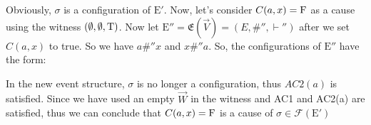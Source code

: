 \begin{example}
\begin{center}
    \end{center}
    Obviously, $\sigma$ is a configuration of $\mathrm{E'}$.
    Now, let's consider $C(a,x) = \mathrm{F}$ as a cause using the witness 
    $(\emptyset,\emptyset,\mathrm{T})$.
    Now let $\mathrm{E}'' = \mathfrak{E}(\vec V) = (E, \#'',\vdash'')$ after we set $C(a,x)$ to true. So we have $a\#''x$ and $x\#''a$.
    So, the configurations of $\mathrm{E}''$ have the form:
    \begin{center}
    \end{center}
    In the new event structure, $\sigma$ is no longer a configuration, thus $AC2(a)$ is satisfied. 
    Since we have used an empty $\vec W$ in the witness and AC1 and AC2(a)
    are satisfied, thus we can conclude that $C(a,x) = \mathrm{F}$ is a cause of 
    $\sigma \in \mathcal{F}(\mathrm{E}')$


\end{example}

